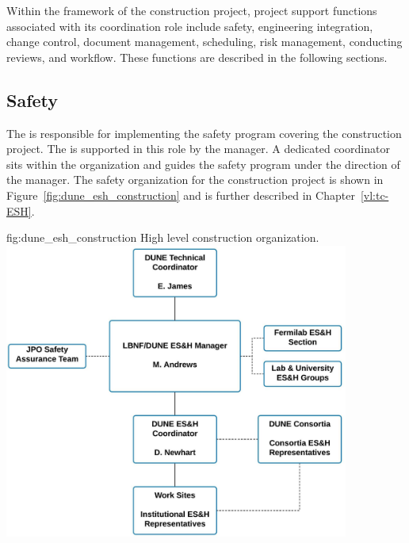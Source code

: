 Within the framework of the   construction 
project,  project support functions associated with its 
coordination role include safety, engineering integration, change control, document management, scheduling, risk management, conducting reviews, and workflow. These functions are described in the following sections. 

\subsection{Safety}
\label{sec:tc_safety}

The  is responsible for implementing the safety program
covering the  construction project.  The  is
supported in this role by the  
manager.  A dedicated   coordinator sits within
the  organization and guides the  safety program
under the direction of the   manager. The
safety organization for the  construction project is shown
in Figure~\ref{fig:dune_esh_construction} and is further described in
Chapter~\ref{vl:tc-ESH}.
\begin{dunefigure}{fig:dune_esh_construction}
  {High level  construction  organization.}
  \includegraphics[width=0.85\textwidth]{graphics/DUNE_Construction_Safety_OrgChart}
\end{dunefigure}

